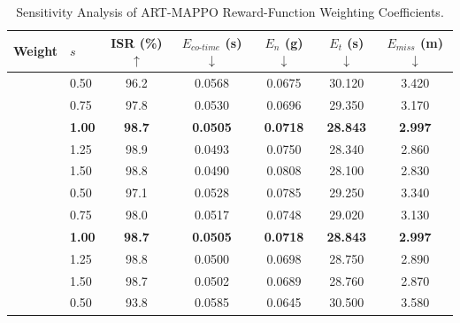 \documentclass[lettersize,journal]{IEEEtran}
\newcommand{\hladd}[1]{{\color{blue}#1}}
\begin{document}
\begin{table}[!t]
\centering
\scriptsize
\setlength{\tabcolsep}{3.5pt}
\renewcommand{\arraystretch}{1.15}
\caption{\hladd{Sensitivity Analysis of ART-MAPPO Reward-Function Weighting
Coefficients.}}
\label{tab:sensitivity_reward}
{\color{blue}
\begin{tabular}{@{}llccccc@{}}
\hline\hline
Weight & $s$ & ISR (\%) $\uparrow$ & $E_{co\text{-}time}$ (s) $\downarrow$
 & $E_n$ (g) $\downarrow$ & $E_t$ (s) $\downarrow$ & $E_{miss}$ (m) $\downarrow$ \\
\midrule
{}
 & 0.50          & 96.2          & 0.0568          & 0.0675          & 30.120          & 3.420 \\
 & 0.75          & 97.8          & 0.0530          & 0.0696          & 29.350          & 3.170 \\
 & \textbf{1.00} & \textbf{98.7} & \textbf{0.0505} & \textbf{0.0718} & \textbf{28.843} & \textbf{2.997} \\
 & 1.25          & 98.9          & 0.0493          & 0.0750          & 28.340          & 2.860 \\
 & 1.50          & 98.8          & 0.0490          & 0.0808          & 28.100          & 2.830 \\
\midrule
{}
 & 0.50          & 97.1          & 0.0528          & 0.0785          & 29.250          & 3.340 \\
 & 0.75          & 98.0          & 0.0517          & 0.0748          & 29.020          & 3.130 \\
 & \textbf{1.00} & \textbf{98.7} & \textbf{0.0505} & \textbf{0.0718} & \textbf{28.843} & \textbf{2.997} \\
 & 1.25          & 98.8          & 0.0500          & 0.0698          & 28.750          & 2.890 \\
 & 1.50          & 98.7          & 0.0502          & 0.0689          & 28.760          & 2.870 \\
\midrule
{}
 & 0.50          & 93.8          & 0.0585          & 0.0645          & 30.500          & 3.580 \\

\end{tabular}}
\end{table}
\end{document}
